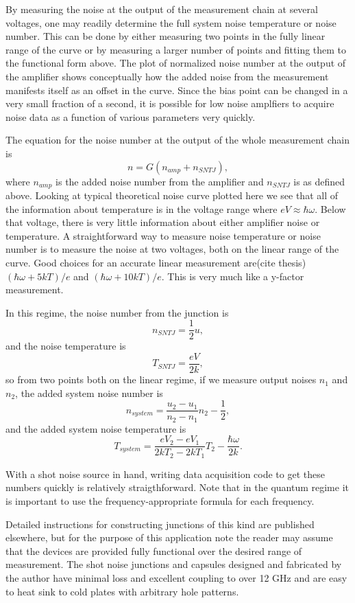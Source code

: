 \documentclass[11pt]{article}
\begin{document}
By measuring the noise at the output of the measurement chain at several voltages, one may readily determine the full system noise temperature or noise number.  This can be done by either measuring two points in the fully linear range of the curve or by measuring a larger number of points and fitting them to the functional form above.  The plot of normalized noise number at the output of the amplifier shows conceptually how the added noise from the measurement manifests itself as an offset in the curve.  Since the bias point can be changed in a very small fraction of a second, it is possible for low noise amplfiers to acquire noise data as a function of various parameters very quickly.  



The equation for the noise number at the output of the whole measurement chain is
$$
n = G(n_{amp} + n_{SNTJ}),
$$
where $n_{amp}$ is the added noise number from the amplifier and $n_{SNTJ}$ is as defined above.  Looking at typical theoretical noise curve plotted here we see that all of the information about temperature is in the voltage range where $eV\approx\hbar\omega$.  Below that voltage, there is very little information about either amplifier noise or temperature.  A straightforward way to measure noise temperature or noise number is to measure the noise at two voltages, both on the linear range of the curve.  Good choices for an accurate linear measurement are(cite thesis) $(\hbar\omega + 5 kT)/e$ and $(\hbar\omega + 10 kT)/e$.  This is very much like a y-factor measurement.  

	In this regime, the noise number from the junction is 
$$
n_{SNTJ} =  \frac{1}{2}u,
$$
and the noise temperature is 
$$
T_{SNTJ} = \frac{eV}{2k},
$$
so from two points both on the linear regime, if we measure output noises $n_1$ and$n_2$, the added system noise number is 
$$
n_{system} = \frac{u_2 -  u_1}{n_2 - n_1}n_2 - \frac{1}{2},
$$
and the added system noise temperature is 
$$
T_{system} = \frac{eV_2 - eV_1}{2kT_2 - 2kT_1}T_2 - \frac{\hbar\omega}{2k}.
$$

	With a shot noise source in hand, writing data acquisition code to get these numbers quickly is relatively straigthforward.  Note that in the quantum regime it is important to use the frequency-appropriate formula for each frequency.  
	

	


	Detailed instructions for constructing junctions of this kind are published elsewhere, but for the purpose of this application note the reader may assume that the devices are provided fully functional over the desired range of measurement.  The shot noise junctions and capsules designed and fabricated by the author have minimal loss and excellent coupling to over 12 GHz and are easy to heat sink to cold plates with arbitrary hole patterns.
	
\end{document}
